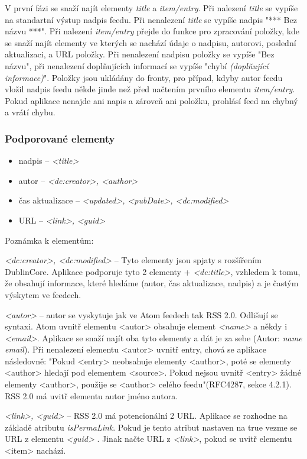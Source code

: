 \documentclass[11pt] {article}
\begin{document}
V první fázi se snaží najít elementy \emph{title} a \emph{item/entry}. Při nalezení \emph{title} se vypíše na standartní výstup nadpis feedu. Při nenalezení \emph{title} se vypíše nadpis "*** Bez názvu ***". Při nalezení \emph{item/entry} přejde do funkce pro zpracování položky, kde se snaží najít elementy ve kterých se nachází údaje o nadpisu, autorovi, poslední aktualizaci, a URL položky. Při nenalezení nadpisu položky se vypíše "Bez názvu", při nenalezení doplňujících informací se vypíše "chybí \emph{(doplňující informace)}". Položky jsou ukládány do fronty, pro případ, kdyby autor feedu vložil nadpis feedu někde jinde než před načtením prvního elementu \emph{item/entry}. Pokud aplikace nenajde ani napis a zároveň ani položku, prohlásí feed na chybný a vrátí chybu.

\subsubsection{Podporované elementy}
\label{sec:elems}
\begin{itemize}
\item nadpis -- \emph{<title>}
\item autor -- \emph{<dc:creator>, <author>}
\item čas aktualizace -- \emph{<updated>, <pubDate>, <dc:modified>}
\item URL --  \emph{<link>, <guid>}
\end{itemize}
Poznámka k elementům:

\emph{<dc:creator>, <dc:modified>} -- Tyto elementy jsou spjaty s rozšířením DublinCore. Aplikace podporuje tyto 2 elementy + \emph{<dc:title>}, vzhledem k tomu, že obsahují informace, které hledáme (autor, čas aktualizace, nadpis) a je častým výskytem ve feedech.

\emph{<autor>} -- autor se vyskytuje jak ve Atom feedech tak RSS 2.0. Odlišují se syntaxi. Atom uvnitř elementu <autor> obsahuje element \emph{<name>} a někdy i \emph{<email>}. Aplikace se snaží najít oba tyto elementy a dát je za sebe (Autor: \emph{name} \emph{email}). Při nenalezení elementu <autor> uvnitř entry, chová se aplikace následovně: "Pokud <entry> neobsahuje elementy <author>, poté se elementy <author> hledají pod elementem <source>. Pokud nejsou uvnitř <entry>  žádné elementy <author>, použije se <author> celého feedu"(RFC4287, sekce 4.2.1)\cite{Atom}. RSS 2.0 má uvitř elementu autor jméno autora.

\emph{<link>, <guid>} -- RSS 2.0 má potencionální 2 URL. Aplikace se rozhodne na základě atributu \emph{isPermaLink}. Pokud je tento atribut nastaven na true vezme se URL z elementu \emph{<guid>} \cite{rss21}. Jinak načte URL z  \emph{<link>}, pokud se uvitř elementu <item> nachází.
\end{document}
